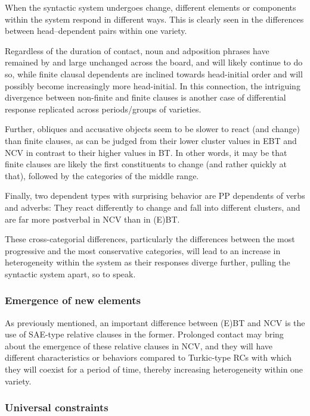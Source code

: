 \documentclass[output=paper,colorlinks,citecolor=brown]{langscibook}
\begin{document}
When the syntactic system undergoes change, different elements or components within the system respond in different ways. This is clearly seen in the differences between head--dependent pairs within one variety. 

Regardless of the duration of contact, noun and adposition phrases have remained by and large unchanged across the board, and will likely continue to do so, while finite clausal dependents are inclined towards head-initial order and will possibly become increasingly more head-initial. In this connection, the intriguing divergence between non-finite and finite clauses is another case of differential response replicated across periods/groups of varieties. 

\begin{sloppypar}
Further, obliques and accusative objects seem to be slower to react (and change) than finite clauses, as can be judged from their lower cluster values in EBT and NCV in contrast to their higher values in BT. In other words, it may be that finite clauses are likely the first constituents to change (and rather quickly at that), followed by the categories of the middle range. 
\end{sloppypar}

Finally, two dependent types with surprising behavior are PP dependents of verbs and adverbs: They react differently to change and fall into different clusters, and are far more postverbal in NCV than in (E)BT.

These cross-categorial differences, particularly the differences between the most progressive and the most conservative categories, will lead to an increase in heterogeneity within the system as their responses diverge further, pulling the syntactic system apart, so to speak.

\subsubsection{Emergence of new elements} 

As previously mentioned, an important difference between (E)BT and NCV is the use of SAE-type relative clauses in the former. Prolonged contact may bring about the emergence of these relative clauses in NCV, and they will have different characteristics or behaviors compared to Turkic-type RCs with which they will coexist for a period of time, thereby increasing heterogeneity within one variety. 

\subsubsection{Universal constraints} 
\end{document}

